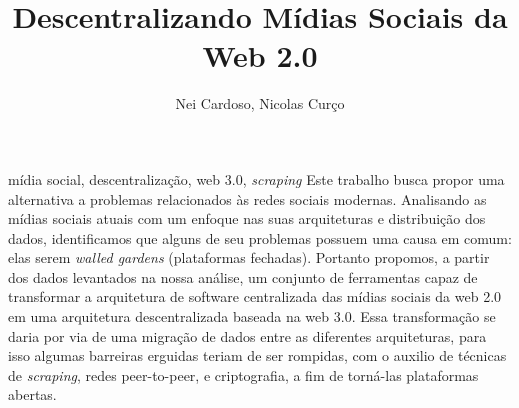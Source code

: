 \documentclass[portuguese,oneside]{tcc}
\author{Nei Cardoso, Nicolas Curço}
\title{Descentralizando Mídias Sociais da Web 2.0}
      {Decentralizing Web 2.0 Social Media}
\begin{document}







\begin{resumo}{mídia social, descentralização, web 3.0, \textit{scraping}}
Este trabalho busca propor uma alternativa a problemas relacionados às redes sociais modernas.
Analisando as mídias sociais atuais com um enfoque nas suas arquiteturas e distribuição dos dados, identificamos que alguns de seu problemas possuem uma causa em comum: elas serem \textit{walled gardens} (plataformas fechadas).
Portanto propomos, a partir dos dados levantados na nossa análise, um conjunto de ferramentas capaz de transformar a arquitetura de software centralizada das mídias sociais da web 2.0 em uma arquitetura descentralizada baseada na web 3.0.
Essa transformação se daria por via de uma migração de dados entre as diferentes arquiteturas, para isso algumas barreiras erguidas teriam de ser rompidas, com o auxilio de técnicas de \textit{scraping}, redes peer-to-peer, e criptografia, a fim de torná-las plataformas abertas.
\end{resumo}
\end{document}
